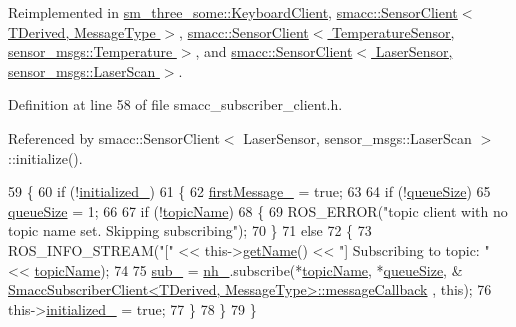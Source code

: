 Reimplemented in \hyperlink{classsm__three__some_1_1KeyboardClient_a8a74266ba37df7f09518b9689ddee828}{sm\+\_\+three\+\_\+some\+::\+Keyboard\+Client}, \hyperlink{classsmacc_1_1SensorClient_ab772bc1d3e1db37a39d3d1992b06cec2}{smacc\+::\+Sensor\+Client$<$ T\+Derived, Message\+Type $>$}, \hyperlink{classsmacc_1_1SensorClient_ab772bc1d3e1db37a39d3d1992b06cec2}{smacc\+::\+Sensor\+Client$<$ Temperature\+Sensor, sensor\+\_\+msgs\+::\+Temperature $>$}, and \hyperlink{classsmacc_1_1SensorClient_ab772bc1d3e1db37a39d3d1992b06cec2}{smacc\+::\+Sensor\+Client$<$ Laser\+Sensor, sensor\+\_\+msgs\+::\+Laser\+Scan $>$}.



Definition at line 58 of file smacc\+\_\+subscriber\+\_\+client.\+h.



Referenced by smacc\+::\+Sensor\+Client$<$ Laser\+Sensor, sensor\+\_\+msgs\+::\+Laser\+Scan $>$\+::initialize().


\begin{DoxyCode}
59   \{
60     \textcolor{keywordflow}{if} (!\hyperlink{classsmacc_1_1SmaccSubscriberClient_a38ca48bff3e170c1cfd6acff9da7661c}{initialized\_})
61     \{
62       \hyperlink{classsmacc_1_1SmaccSubscriberClient_acfb1bf9d488d40a55c61861e2bc39346}{firstMessage\_} = \textcolor{keyword}{true};
63 
64       \textcolor{keywordflow}{if} (!\hyperlink{classsmacc_1_1SmaccSubscriberClient_ac75e9d490c0383a7a686f05b2d4fcc68}{queueSize})
65         \hyperlink{classsmacc_1_1SmaccSubscriberClient_ac75e9d490c0383a7a686f05b2d4fcc68}{queueSize} = 1;
66 
67       \textcolor{keywordflow}{if} (!\hyperlink{classsmacc_1_1SmaccSubscriberClient_a573625f4b97228c0e9110fb4538722f2}{topicName})
68       \{
69         ROS\_ERROR(\textcolor{stringliteral}{"topic client with no topic name set. Skipping subscribing"});
70       \}
71       \textcolor{keywordflow}{else}
72       \{
73         ROS\_INFO\_STREAM(\textcolor{stringliteral}{"["} << this->\hyperlink{classsmacc_1_1ISmaccClient_a20846aabfd1de832aa27d7a8237a1742}{getName}() << \textcolor{stringliteral}{"] Subscribing to topic: "} << 
      \hyperlink{classsmacc_1_1SmaccSubscriberClient_a573625f4b97228c0e9110fb4538722f2}{topicName});
74 
75         \hyperlink{classsmacc_1_1SmaccSubscriberClient_a1570353cc228141c8a401776e2ef31c9}{sub\_} = \hyperlink{classsmacc_1_1SmaccSubscriberClient_a687bdd388ad68d5831138e7eb70fb9ae}{nh\_}.subscribe(*\hyperlink{classsmacc_1_1SmaccSubscriberClient_a573625f4b97228c0e9110fb4538722f2}{topicName}, *\hyperlink{classsmacc_1_1SmaccSubscriberClient_ac75e9d490c0383a7a686f05b2d4fcc68}{queueSize}, &
      \hyperlink{classsmacc_1_1SmaccSubscriberClient_aeeaa8569c2abca5ec9639f975d2c4226}{SmaccSubscriberClient<TDerived, MessageType>::messageCallback}
      , \textcolor{keyword}{this});
76         this->\hyperlink{classsmacc_1_1SmaccSubscriberClient_a38ca48bff3e170c1cfd6acff9da7661c}{initialized\_} = \textcolor{keyword}{true};
77       \}
78     \}
79   \}
\end{DoxyCode}


